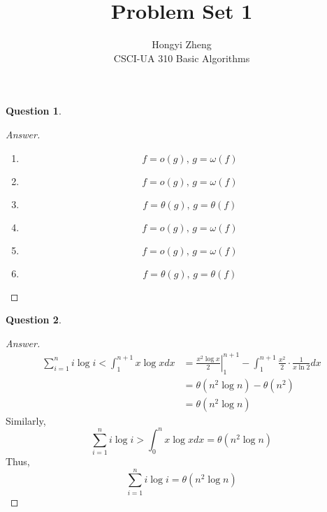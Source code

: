 \documentclass{article}
\title{Problem Set 1}
\author{%
    Hongyi Zheng
\\  CSCI-UA 310 Basic Algorithms
}
\theoremstyle{plain}
\newtheorem{question}{Question}
\newenvironment{answer}[1][Answer]
    {\begin{proof}[#1]{$ $}\renewcommand\qedsymbol{$\vartriangle$}}
    {\end{proof}}
\begin{document}
\maketitle


\begin{question}
\end{question}
\begin{answer}
    \begin{enumerate}
        \item
        \begin{equation*}
            f = o(g),\,g = \omega(f)
        \end{equation*}
        \item
        \begin{equation*}
            f = o(g),\,g = \omega(f)
        \end{equation*}
        \item
        \begin{equation*}
            f = \theta(g),\,g = \theta(f)
        \end{equation*}
        \item
        \begin{equation*}
            f = o(g),\,g = \omega(f)
        \end{equation*}
        \item
        \begin{equation*}
            f = o(g),\,g = \omega(f)
        \end{equation*}
        \item
        \begin{equation*}
            f = \theta(g),\,g = \theta(f)
        \end{equation*}
    \end{enumerate}
\end{answer}

\begin{question}
\end{question}
\begin{answer}
    \begin{equation*}
    \begin{aligned}
    \sum_{i=1}^{n} i \log{i}<\int_{1}^{n+1} x \log x d x &=\left.\frac{x^{2} \log x}{2}\right|_{1} ^{n+1}-\int_{1}^{n+1} \frac{x^{2}}{2} \cdot \frac{1}{x \ln 2} d x \\
    &=\theta\left(n^{2} \log n\right)-\theta\left(n^{2}\right) \\
    &=\theta\left(n^{2} \log n\right)
    \end{aligned}
    \end{equation*}
    Similarly,
    \begin{equation*}
    \sum_{i=1}^{n} i \log{i}>\int_{0}^{n} x \log x d x = \theta\left(n^{2} \log n\right)
    \end{equation*}
    Thus,
    \begin{equation*}
    \sum_{i=1}^{n} i \log{i} = \theta\left(n^{2} \log n\right)
    \end{equation*}
\end{answer}
\end{document}
